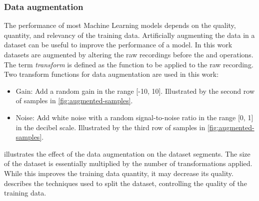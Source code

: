 \subsubsection{Data augmentation} \label{subsec:data-augmentation}

The performance of most Machine Learning models depends on the quality,
quantity, and relevancy of the training data. Artificially augmenting the data
in a dataset can be useful to improve the performance of a model. In this work
datasets are augmented by altering the raw recordings before the
 and  operations.
The term \emph{transform} is defined as the function to be applied to the raw
recording. Two transform functions for data augmentation are used in this work:

\begin{itemize}
    \item Gain: Add a random gain in the range [-10, 10]. Illustrated by the
          second row of samples in \cref{fig:augmented-samples}.
    \item Noise: Add white noise with a random signal-to-noise ratio in the
          range [0, 1] in the decibel scale. Illustrated by the third row of
          samples in \cref{fig:augmented-samples}.
\end{itemize}

 illustrates the effect of the data augmentation on
the dataset segments. The size of the dataset is essentially multiplied by the
number of transformations applied. While this improves the training data
quantity, it may decrease its quality.  describes
the techniques used to split the dataset, controlling the quality of the
training data.